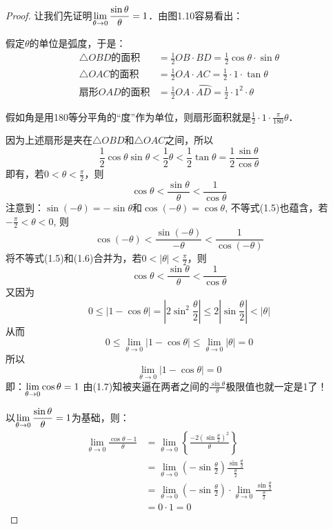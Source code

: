 \begin{proof}
    让我们先证明$\displaystyle\lim_{\theta\to 0}\dfrac{\sin\theta }{\theta}=1$．由图1.10容易看出：

假定$\theta$的单位是弧度，于是：
\[\begin{split}
    \triangle OBD\text{的面积}&=\frac{1}{2}OB\cdot BD=\frac{1}{2}\cos\theta\cdot \sin\theta\\
    \triangle OAC\text{的面积}&=\frac{1}{2}OA\cdot AC=\frac{1}{2}\cdot 1\cdot \tan\theta\\
    \text{扇形$OAD$的面积}&=\frac{1}{2}OA\cdot \wideparen{AD}=\frac{1}{2}\cdot 1^2\cdot \theta
\end{split}\]

假如角是用180等分平角的“度”作为单位，则扇形面积就是$\frac{1}{2}\cdot 1\cdot \frac{\pi}{180}\theta$．

因为上述扇形是夹在$\triangle OBD$和$\triangle OAC$之间，所以
\begin{equation}
    \frac{1}{2}\cos\theta\sin\theta<\frac{1}{2}\theta<\frac{1}{2}\tan\theta=\frac{1}{2}\frac{\sin\theta}{\cos\theta}
\end{equation}
即有，若$0<\theta<\frac{\pi}{2}$，则
\begin{equation}
    \cos\theta<\frac{\sin\theta}{\theta}<\frac{1}{\cos\theta}
\end{equation}
注意到：$\sin(-\theta)=-\sin\theta$和$\cos(-\theta)=\cos\theta$, 不等式(1.5)也蕴含，若$-\frac{\pi}{2}<\theta<0$, 则
\begin{equation}
    \cos(-\theta)<\frac{\sin(-\theta)}{-\theta}<\frac{1}{\cos(-\theta)}
\end{equation}
将不等式(1.5)和(1.6)合并为，若$0<|\theta|<\frac{\pi}{2}$，则
\begin{equation}
    \cos\theta<\frac{\sin\theta}{\theta}<\frac{1}{\cos\theta}
\end{equation}
又因为
\[0\le |1-\cos\theta|=\left|2\sin^2\frac{\theta}{2}\right|\le 2\left|\sin\frac{\theta}{2}\right|<|\theta|\]
从而
\[0\le \lim_{\theta\to 0}|1-\cos\theta|\le \lim_{\theta\to 0}|\theta|=0\]
所以
\[\lim_{\theta\to 0}|1-\cos\theta|=0\]
即：$\displaystyle\lim_{\theta\to 0}\cos\theta=1$
由(1.7)知被夹逼在两者之间的$\frac{\sin\theta}{\theta}$极限值也就一定是1了！

以$\displaystyle\lim_{\theta\to 0}\dfrac{\sin\theta}{\theta}=1$为基础，则：
\[\begin{split}
\lim_{\theta\to 0}\frac{\cos\theta-1}{\theta}&=\lim_{\theta\to 0}\left\{\frac{-2\left(\sin\frac{\theta}{2}\right)^2}{\theta}\right\}\\
&= \lim_{\theta\to 0}\left(-\sin\frac{\theta}{2}\right)\frac{\sin\frac{\theta}{2}}{\frac{\theta}{2}}    \\
&=\lim_{\theta\to 0}\left(-\sin\frac{\theta}{2}\right)\cdot \lim_{\theta\to 0}\frac{\sin\frac{\theta}{2}}{\frac{\theta}{2}}   \\
&=0\cdot 1=0
\end{split}   
\]
\end{proof}

